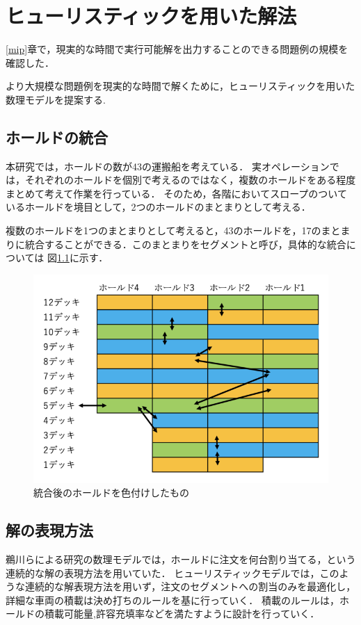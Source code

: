 \chapter{ヒューリスティックを用いた解法}\label{method2}
\ref{mip}章で，現実的な時間で実行可能解を出力することのできる問題例の規模を確認した．

より大規模な問題例を現実的な時間で解くために，ヒューリスティックを用いた数理モデルを提案する.

\section{ホールドの統合}
本研究では，ホールドの数が43の運搬船を考えている．
実オペレーションでは，それぞれのホールドを個別で考えるのではなく，複数のホールドをある程度まとめて考えて作業を行っている．
そのため，各階においてスロープのついているホールドを境目として，2つのホールドのまとまりとして考える．

複数のホールドを1つのまとまりとして考えると，43のホールドを，17のまとまりに統合することができる．このまとまりをセグメントと呼び，具体的な統合については
図\ref{fig1}に示す．\\

\begin{figure}[H]
 \centering
 \includegraphics[slace=0.2]{segment.png}
 \caption{統合後のホールドを色付けしたもの}
 \label{fig1}
\end{figure}



\section{解の表現方法}
鵜川らによる研究の数理モデル\cite{ukawa}では，ホールドに注文を何台割り当てる，という連続的な解の表現方法を用いていた．
ヒューリスティックモデルでは，このような連続的な解表現方法を用いず，注文のセグメントへの割当のみを最適化し，詳細な車両の積載は決め打ちのルールを基に行っていく．
積載のルールは，ホールドの積載可能量,許容充填率などを満たすように設計を行っていく．


